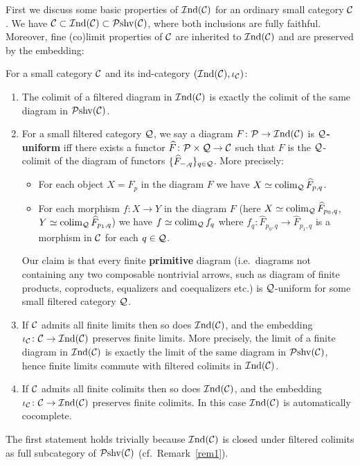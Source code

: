 \documentclass[twoside]{article}
\begin{document}


First we discuss some basic properties of $\mathcal{I}\mathrm{nd}({\mathcal{C}})$ for an ordinary small category ${\mathcal{C}}$. We have ${\mathcal{C}} \subset \mathcal{I}\mathrm{nd}({\mathcal{C}}) \subset \mathcal{P}\mathrm{shv}({\mathcal{C}})$, where both inclusions are fully faithful. Moreover, fine (co)limit properties of ${\mathcal{C}}$ are inherited to $\mathcal{I}\mathrm{nd}({\mathcal{C}})$ and are preserved by the embedding:
\begin{fact}\label{fact1} For a small category ${\mathcal{C}}$ and its ind-category $(\mathcal{I}\mathrm{nd}({\mathcal{C}}), \iota_{\mathcal{C}})$:
\begin{enumerate}[format=\textup]
\item The colimit of a filtered diagram in $\mathcal{I}\mathrm{nd}({\mathcal{C}})$ is exactly the colimit of the same diagram in $\mathcal{P}\mathrm{shv}({\mathcal{C}})$.
\item For a small filtered category ${\mathcal{Q}}$, we say a diagram $F\colon {\mathcal{P}} \rightarrow \mathcal{I}\mathrm{nd}({\mathcal{C}})$ is \textbf{${\mathcal{Q}}$-uniform} iff there exists a functor $\widehat{F}\colon {\mathcal{P}} \times {\mathcal{Q}} \rightarrow {\mathcal{C}}$ such that $F$ is the ${\mathcal{Q}}$-colimit of the diagram of functors $\{\widehat{F}_{-,q}\}_{q \in {\mathcal{Q}}}$. More precisely:
\begin{itemize}
\item For each object $X = F_p$ in the diagram $F$ we have $X \simeq \operatorname*{\mathrm{colim}}_{\mathcal{Q}} \widehat{F}_{p,q}$.
\item For each morphism $f\colon X \rightarrow Y$ in the diagram $F$ (here $X \simeq \operatorname*{\mathrm{colim}}_{\mathcal{Q}} \widehat{F}_{p_0, q}$,  $Y \simeq \operatorname*{\mathrm{colim}}_{\mathcal{Q}} \widehat{F}_{p_1, q}$) we have $f \simeq \operatorname*{\mathrm{colim}}_{\mathcal{Q}} f_q$ where $f_q\colon \widehat{F}_{p_0,q} \rightarrow \widehat{F}_{p_1,q}$ is a morphism in ${\mathcal{C}}$ for each $q \in {\mathcal{Q}}$.
\end{itemize}  
Our claim is that every finite \textbf{primitive} diagram (i.e.\ diagrams not containing any two composable nontrivial arrows, such as diagram of finite products, coproducts, equalizers and coequalizers etc.) is ${\mathcal{Q}}$-uniform for some small filtered category ${\mathcal{Q}}$.
\item If ${\mathcal{C}}$ admits all finite limits then so does $\mathcal{I}\mathrm{nd}({\mathcal{C}})$, and the embedding $\iota_{\mathcal{C}}\colon {\mathcal{C}} \rightarrow \mathcal{I}\mathrm{nd}({\mathcal{C}})$ preserves finite limits. More precisely, the limit of a finite diagram in $\mathcal{I}\mathrm{nd}({\mathcal{C}})$ is exactly the limit of the same diagram in $\mathcal{P}\mathrm{shv}({\mathcal{C}})$, hence finite limits commute with filtered colimits in $\mathcal{I}\mathrm{nd}({\mathcal{C}})$.
\item If ${\mathcal{C}}$ admits all finite colimits then so does $\mathcal{I}\mathrm{nd}({\mathcal{C}})$, and the embedding $\iota_{\mathcal{C}}\colon {\mathcal{C}} \rightarrow \mathcal{I}\mathrm{nd}({\mathcal{C}})$ preserves finite colimits. In this case $\mathcal{I}\mathrm{nd}({\mathcal{C}})$ is automatically cocomplete.
\end{enumerate}
\end{fact}
The first statement holds trivially because $\mathcal{I}\mathrm{nd}({\mathcal{C}})$ is closed under filtered colimits as full subcategory of $\mathcal{P}\mathrm{shv}({\mathcal{C}})$ (cf.\ Remark~\ref{rem1}).\vspace{\topsep}
\end{document}
